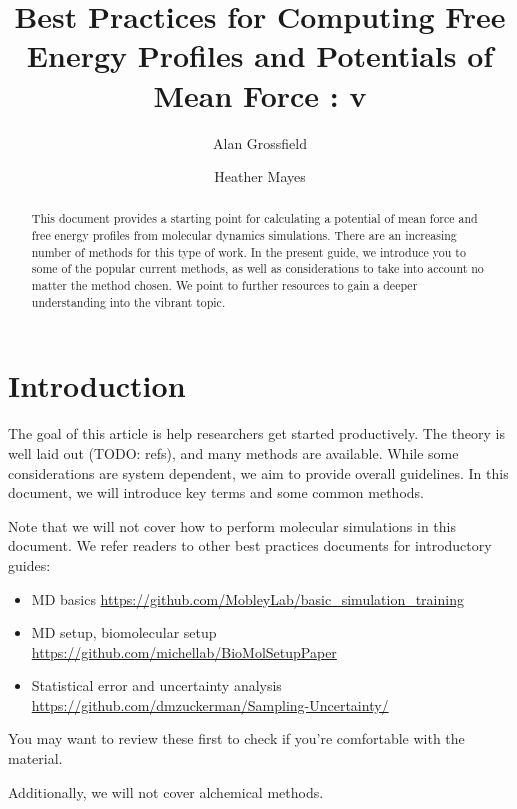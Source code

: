 \documentclass[9pt]{livecoms}
\title{Best Practices for Computing Free Energy Profiles and Potentials of Mean Force : v\versionnumber}
\author[1]{Alan Grossfield}
\author[2]{Heather Mayes}
\affil[1]{University of Rochester}
\affil[2]{University of Michigan}
\begin{document}
\begin{frontmatter}
\maketitle

\begin{abstract}
This document provides a starting point for calculating a potential of mean force and free energy profiles from molecular dynamics simulations. There are an increasing number of methods for this type of work. In the present guide, we introduce you to some of the popular current methods, as well as considerations to take into account no matter the method chosen. We point to further resources to gain a deeper understanding into the vibrant topic.
\end{abstract}
\end{frontmatter}

\section{Introduction}
The goal of this article is help researchers get started productively. The theory is well laid out (TODO: refs), and many methods are available. While some considerations are system dependent, we aim to provide overall guidelines. In this document, we will introduce key terms and some common methods.

Note that we will not cover how to perform molecular simulations in this document. We refer readers to other best practices documents for introductory guides:
\begin{itemize}
\item MD basics \url{https://github.com/MobleyLab/basic_simulation_training}
\item MD setup, biomolecular setup \url{https://github.com/michellab/BioMolSetupPaper}
\item Statistical error and uncertainty analysis \url{https://github.com/dmzuckerman/Sampling-Uncertainty/}
\end{itemize}
You may want to review these first to check if you're comfortable with the material.

Additionally, we will not cover alchemical methods. 
\end{document}
